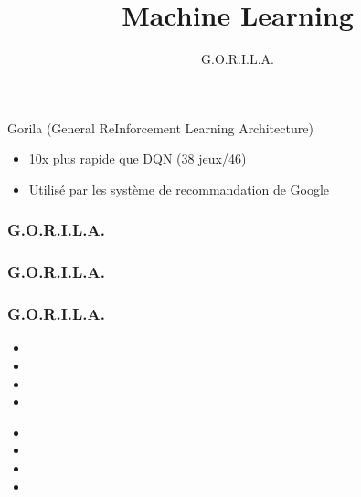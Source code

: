 \documentclass{formation}
\title{Machine Learning}
\subtitle{G.O.R.I.L.A.}
\begin{document}
\maketitle


\begin{frame}
  Gorila (General ReInforcement Learning Architecture)
  \begin{itemize}
  \item 10x plus rapide que DQN (38 jeux/46)
  \item Utilisé par les système de recommandation de Google
  \end{itemize}
\end{frame}


\begin{frame}
  \frametitle{G.O.R.I.L.A.}
\end{frame}

\begin{frame}
  \frametitle{G.O.R.I.L.A.}
\end{frame}

\begin{frame}
  \frametitle{G.O.R.I.L.A.}

  
  \begin{itemize}
  \item 
  \item 
  \item 
  \item 
  \end{itemize}

  \begin{minipage}[l]{0.49\linewidth}
  \end{minipage}\hfill
  \begin{minipage}[l]{0.49\linewidth}
  \end{minipage}\hfill

  \begin{minipage}[l]{0.49\linewidth}
      \begin{itemize}
      \item 
      \item 
      \item 
      \item 
      \end{itemize}
  \end{minipage}\hfill
  \begin{minipage}[l]{0.49\linewidth}
  \end{minipage}\hfill

\end{frame}
\end{document}

